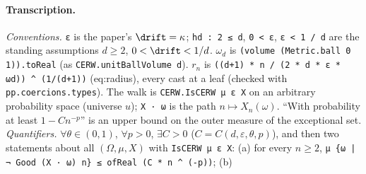 \paragraph{Transcription.}
\emph{Conventions.} \verb!ε! is the paper's $\drift=\kappa$; \verb!hd : 2 ≤ d!, \verb!0 < ε!, \verb!ε < 1 / d! are the standing assumptions $d\ge2$, $0<\drift<1/d$. $\omega_d$ is \verb!(volume (Metric.ball 0 1)).toReal! (as \verb!CERW.unitBallVolume d!). $r_n$ is \verb!((d+1) * n / (2 * d * ε * ωd)) ^ (1/(d+1))! (eq:radius), every cast at a leaf (checked with \verb!pp.coercions.types!). The walk is \verb!CERW.IsCERW μ ε X! on an arbitrary probability space (universe $u$); \verb!X · ω! is the path $n\mapsto X_n(\omega)$. ``With probability at least $1-Cn^{-p}$'' is an upper bound on the outer measure of the exceptional set. \emph{Quantifiers.} $\forall\theta\in(0,1)$, $\forall p>0$, $\exists C>0$ ($C=C(d,\varepsilon,\theta,p)$), and then two statements about all $(\Omega,\mu,X)$ with \verb!IsCERW μ ε X!: (a) for every $n\ge2$, \verb!μ {ω | ¬ Good (X · ω) n} ≤ ofReal (C * n ^ (-p))!; (b)
